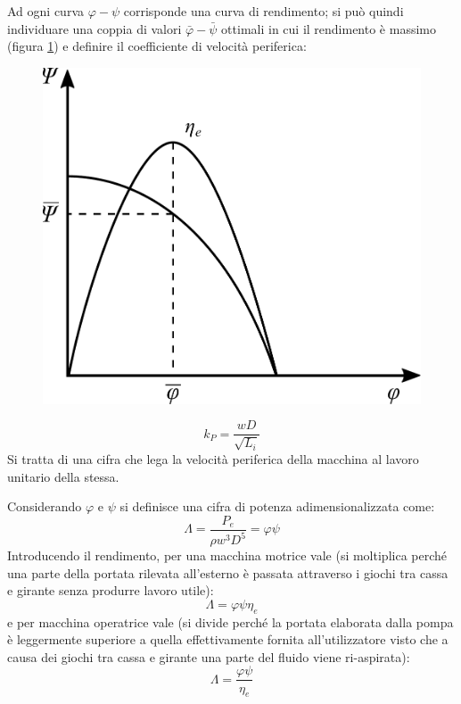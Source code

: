 Ad ogni curva $\varphi - \psi$ corrisponde una curva di rendimento; si può quindi individuare una coppia di valori $\bar{\varphi} - \bar{\psi}$ ottimali in cui il rendimento è massimo (figura \ref{fig:adim}) e definire il coefficiente di velocità periferica:
\begin{figure}[h!]
\centering
  \includegraphics[width=.3\textwidth]{fig/adim.pdf}
\caption{}
\label{fig:adim}
\end{figure}
\begin{equation}
k_P = \frac{w D}{\sqrt{L_i}}
\end{equation}
Si tratta di una cifra che lega la velocità periferica della macchina al lavoro unitario della stessa.

Considerando $\varphi$ e $\psi$ si definisce una cifra di potenza adimensionalizzata come:
\begin{equation}
\Lambda = \frac{P_e}{\rho w^3 D^5} = \varphi \psi
\end{equation}
Introducendo il rendimento, per una macchina motrice vale (si moltiplica perché una parte della portata rilevata all'esterno è passata attraverso i giochi tra cassa e girante senza produrre lavoro utile):
\begin{equation}
\Lambda = \varphi \psi \eta_e
\end{equation}
e per macchina operatrice vale (si divide perché la portata elaborata dalla pompa è leggermente superiore a quella effettivamente fornita all'utilizzatore visto che a causa dei giochi tra cassa e girante una parte del fluido viene ri-aspirata):
\begin{equation}
\Lambda = \frac{\varphi \psi}{\eta_e}
\end{equation}

